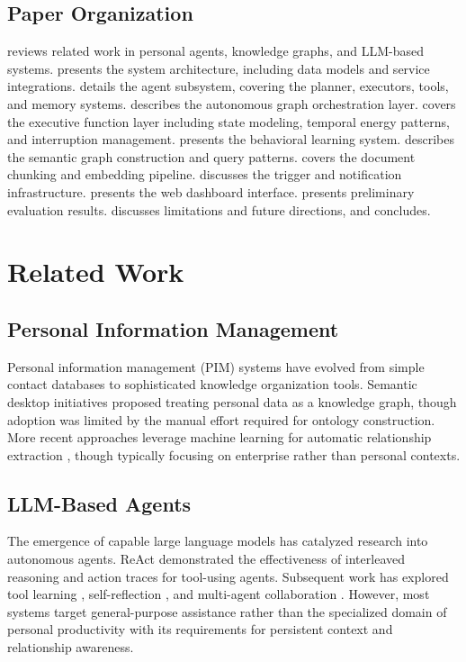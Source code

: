 \documentclass[11pt,a4paper]{article}
\begin{document}
\subsection{Paper Organization}

 reviews related work in personal agents, knowledge graphs, and LLM-based systems.  presents the system architecture, including data models and service integrations.  details the agent subsystem, covering the planner, executors, tools, and memory systems.  describes the autonomous graph orchestration layer.  covers the executive function layer including state modeling, temporal energy patterns, and interruption management.  presents the behavioral learning system.  describes the semantic graph construction and query patterns.  covers the document chunking and embedding pipeline.  discusses the trigger and notification infrastructure.  presents the web dashboard interface.  presents preliminary evaluation results.  discusses limitations and future directions, and  concludes.

\section{Related Work}
\label{sec:related}

\subsection{Personal Information Management}

Personal information management (PIM) systems have evolved from simple contact databases to sophisticated knowledge organization tools. Semantic desktop initiatives \citep{sauermann2005semantic} proposed treating personal data as a knowledge graph, though adoption was limited by the manual effort required for ontology construction. More recent approaches leverage machine learning for automatic relationship extraction \citep{dong2014knowledge}, though typically focusing on enterprise rather than personal contexts.

\subsection{LLM-Based Agents}

The emergence of capable large language models has catalyzed research into autonomous agents. ReAct \citep{yao2022react} demonstrated the effectiveness of interleaved reasoning and action traces for tool-using agents. Subsequent work has explored tool learning \citep{qin2023toolllm}, self-reflection \citep{shinn2023reflexion}, and multi-agent collaboration \citep{park2023generative}. However, most systems target general-purpose assistance rather than the specialized domain of personal productivity with its requirements for persistent context and relationship awareness.
\end{document}
